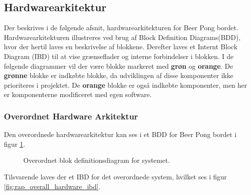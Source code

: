 \documentclass[Rapport/Rapport_main.tex]{subfiles}
\begin{document}
\subsection{Hardwarearkitektur}
Der beskrives i de følgende afsnit, hardwarearkitekturen for Beer Pong bordet. Hardwarearkitekturen illustreres ved brug af Block Definition Diagrams(BDD), hvor der hertil laves en beskrivelse af blokkene. Derefter laves et Internt Block Diagram (IBD) til at vise grænseflader og interne forbindelser i blokken. I de følgende diagrammer vil der være blokke markeret med \textbf{grøn} og \textbf{orange}. De \textbf{grønne} blokke er indkøbte blokke, da udviklingen af disse komponenter ikke prioriteres i projektet. De \textbf{orange} blokke er også indkøbte komponenter, men her er komponenterne modificeret med egen software.
\subsubsection{Overordnet Hardware Arkitektur}
Den overordnede hardwarearkitektur kan ses i et BDD for Beer Pong bordet i figur \ref{fig:rap_overall_hardware_bdd}.

\begin{figure}[H]
    \centering
    \caption{Overordnet blok definitionsdiagram for systemet.}
    \label{fig:rap_overall_hardware_bdd}
\end{figure}
Tilsvarende laves der et IBD for det overordnede system, hvilket ses i figur \ref{fig:rap_overall_hardware_ibd}.
\end{document}
